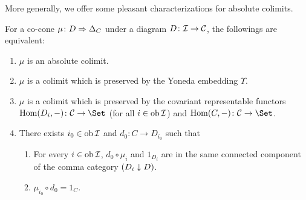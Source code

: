   More generally, we offer some pleasant characterizations for absolute colimits.
  \begin{thm}
     For a co-cone $\mu\colon D\Rightarrow\Delta_C$ under a diagram $D\colon {\cal I}\to {\cal C}$, the followings are equivalent:
     \begin{enumerate}
       \item $\mu$ is an absolute colimit.
       \item $\mu$ is a colimit which is preserved by the Yoneda embedding $\Upsilon$.
       \item $\mu$ is a colimit which is preserved by the covariant representable functors $\Hom(D_i,-)\colon \Cc\to \Set$ (for all $i\in\operatorname{ob}{\cal I}$) and $\Hom(C,-)\colon \Cc\to \Set$.
       \item There exists $i_0\in\operatorname{ob}{\cal I}$ and $d_0\colon C\to D_{i_0}$ such that
       \begin{enumerate}
         \item For every $i\in\operatorname{ob}{\cal I}$, $d_0 \circ \mu_i$ and $1_{D_i}$ are in the same connected component of the comma category $(D_i \downarrow D)$.
         \item $\mu_{i_0} \circ d_0 = 1_{C}$.
       \end{enumerate}
     \end{enumerate}
  \end{thm}
